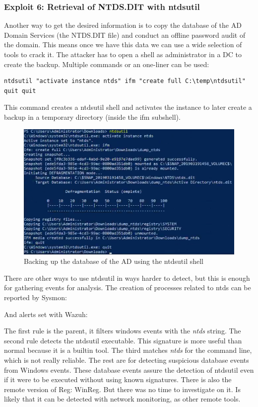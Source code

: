 \subsubsection{Exploit 6: Retrieval of NTDS.DIT with ntdsutil}
Another way to get the desired information is to copy the database of the AD Domain Services (the NTDS.DIT file) and conduct an offline password audit of the domain. This means once we have this data we can use a wide selection of tools to crack it\cite{ntdsdit_tools}\cite{extracting_ntds}\cite{ntds_powershell}.
\linej
\linej
The attacker has to open a shell as administrator in a DC to create the backup. Multiple commands or an one-liner can be used:
\begin{lstlisting}[style=PS]
ntdsutil "activate instance ntds" ifm "create full C:\temp\ntdsutil" quit quit
\end{lstlisting}
\linej
This command creates a ntdsutil shell and activates the instance to later create a backup in a temporary directory (inside the ifm subshell).
\begin{figure}[H]
	\centering
	\includegraphics[width=\textwidth]{figuras/ntdsutil.png}
	\caption{Backing up the database of the AD using the ntdsutil shell}
\end{figure}
\linej
There are other ways to use ntdsutil in ways harder to detect\cite{more_dumps}, but this is enough for gathering events for analysis.
\linej
\linej
The creation of processes related to ntds can be reported by Sysmon:

\linej
And alerts set with Wazuh:
\label{ntdsutil_detection}

\linej
The first rule is the parent, it filters windows events with the \textit{ntds} string.
\linej
The second rule detects the ntdsutil executable. This signature is more useful than normal because it is a builtin tool. The third matches \textit{ntds} for the command line, which is not really reliable.
\linej
The rest are for detecting suspicious database events from Windows events. These database events assure the detection of ntdsutil even if it were to be executed without using known signatures.
\linej
\linej
There is also the remote version of Reg: WinReg. But there was no time to investigate on it. Is likely that it can be detected with network monitoring, as other remote tools.

